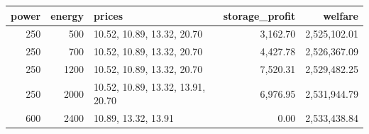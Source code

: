 \begin{tabular}{rrlrr}
\toprule
power & energy & prices & storage\_profit & welfare \\
\midrule
250 & 500 & 10.52, 10.89, 13.32, 20.70 & 3,162.70 & 2,525,102.01 \\
250 & 700 & 10.52, 10.89, 13.32, 20.70 & 4,427.78 & 2,526,367.09 \\
250 & 1200 & 10.52, 10.89, 13.32, 20.70 & 7,520.31 & 2,529,482.25 \\
250 & 2000 & 10.52, 10.89, 13.32, 13.91, 20.70 & 6,976.95 & 2,531,944.79 \\
600 & 2400 & 10.89, 13.32, 13.91 & 0.00 & 2,533,438.84 \\
\bottomrule
\end{tabular}
